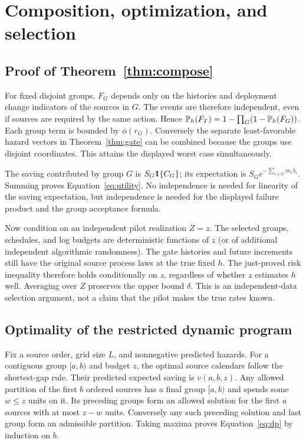 \section{Composition, optimization, and selection}\label{app:partition}
\subsection{Proof of Theorem~\ref{thm:compose}}
For fixed disjoint groups, $F_G$ depends only on the histories and deployment change indicators of the sources in $G$. The events are therefore independent, even if sources are required by the same action. Hence $\mathbb P_h(F_T)=1-\prod_G(1-\mathbb P_h(F_G))$. Each group term is bounded by $\phi(r_G)$. Conversely the separate least-favorable hazard vectors in Theorem~\ref{thm:gate} can be combined because the groups use disjoint coordinates. This attains the displayed worst case simultaneously.

The saving contributed by group $G$ is $S_G\mathbf 1\{C_G\}$; its expectation is $S_Ge^{-\sum_{i\in G}m_i\lambda_i}$. Summing proves Equation~\eqref{eq:utility}. No independence is needed for linearity of the saving expectation, but independence is needed for the displayed failure product and the group acceptance formula.

Now condition on an independent pilot realization $Z=z$. The selected groups, schedules, and log budgets are deterministic functions of $z$ (or of additional independent algorithmic randomness). The gate histories and future increments still have the original source process laws at the true fixed $h$. The just-proved risk inequality therefore holds conditionally on $z$, regardless of whether $z$ estimates $h$ well. Averaging over $Z$ preserves the upper bound $\delta$. This is an independent-data selection argument, not a claim that the pilot makes the true rates known.

\subsection{Optimality of the restricted dynamic program}
Fix a source order, grid size $L$, and nonnegative predicted hazards. For a contiguous group $[a,b)$ and budget $z$, the optimal source calendars follow the shortest-gap rule. Their predicted expected saving is $v(a,b,z)$. Any allowed partition of the first $b$ ordered sources has a final group $[a,b)$ and spends some $w\leq z$ units on it. Its preceding groups form an allowed solution for the first $a$ sources with at most $z-w$ units. Conversely any such preceding solution and last group form an admissible partition. Taking maxima proves Equation~\eqref{eq:dp} by induction on $b$.

